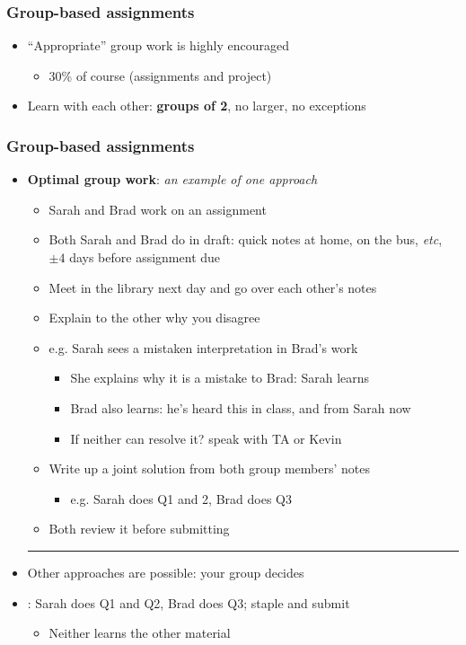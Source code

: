 \begin{frame}\frametitle{Group-based assignments}
	\begin{itemize}
		\item	``Appropriate'' group work is highly encouraged
		\begin{itemize}
			\item	30\% of course (assignments and project)
		\end{itemize}
		\item	Learn with each other: \textbf{groups of 2}, no larger, no exceptions
	\end{itemize}
\end{frame}

\begin{frame}\frametitle{Group-based assignments}
	\begin{itemize}
		\item	\textbf{Optimal group work}: \emph{an example of one approach}
			\begin{itemize}
				\item	Sarah and Brad work on an assignment
				\item	Both Sarah and Brad do {} in draft: quick notes at home, on the bus, \emph{etc}, $\pm 4$ days before assignment due
				\pause
				\item	Meet in the library next day and go over each other's notes
				\item	Explain to the other why you disagree
				\item	e.g. Sarah sees a mistaken interpretation in Brad's work
				\begin{itemize}
					\item	She explains why it is a mistake to Brad: Sarah learns
					\item	Brad also learns: he's heard this in class, and from Sarah now
					\item	If neither can resolve it? speak with TA or Kevin
				\end{itemize}
				\pause
				\item	Write up a joint solution from both group members' notes
				\begin{itemize}
					\item	e.g. Sarah does Q1 and 2, Brad does Q3
				\end{itemize}
				\item	Both review it before submitting
			\end{itemize}
		\vspace{2pt}\hrule\vspace{2pt}
		\pause
		\item	Other approaches are possible: your group decides
		\item	{\color{myOrange}{What doesn't work}:} Sarah does Q1 and Q2, Brad does Q3; staple and submit
		\begin{itemize}
			\item	Neither learns the other material
		\end{itemize}
	\end{itemize}
\end{frame}

